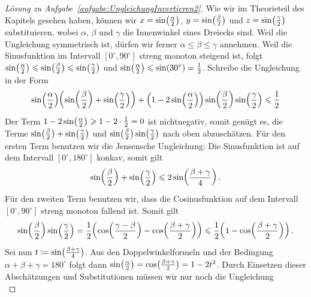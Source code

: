 \begin{proof}[Lösung zu Aufgabe~\ref{aufgabe:UngleichungInvertieren2}]
	Wie wir im Theorieteil des Kapitels gesehen haben, können wir $x=\sin\parens[\big]{\frac{\alpha}2}$, $y=\sin\parens[\big]{\frac{\beta}2}$ und $z=\sin\parens[\big]{\frac{\gamma}2}$ substituieren, wobei $\alpha$, $\beta$ und $\gamma$ die Innenwinkel eines Dreiecks sind. Weil die Ungleichung symmetrisch ist, dürfen wir ferner $\alpha\leqslant \beta\leqslant \gamma$ annehmen. Weil die Sinusfunktion im Intervall $[0^\circ,90^\circ]$ streng monoton steigend ist, folgt $\sin\parens[\big]{\frac{\alpha}2}\leqslant\sin\parens[\big]{\frac{\beta}2}\leqslant\sin\parens[\big]{\frac{\gamma}2}$ und $\sin\parens[\big]{\frac{\alpha}2}\leqslant \sin(30^\circ)=\frac12$. Schreibe die Ungleichung in der Form
	\begin{equation*}
		\sin\parens*{\frac{\alpha}2}\parens*{\sin\parens*{\frac{\beta}2}+\sin\parens*{\frac{\gamma}2}}+\parens*{1-2\sin\parens*{\frac{\alpha}2}}\sin\parens*{\frac{\beta}2}\sin\parens*{\frac{\gamma}2}\leqslant \frac12
	\end{equation*}
	Der Term $1-2\sin\parens[\big]{\frac{\alpha}2}\geqslant 1-2\cdot\frac12=0$ ist nichtnegativ, somit genügt es, die Terme $\sin\parens[\big]{\frac{\beta}2}+\sin\parens[\big]{\frac{\gamma}2}$ und $\sin\parens[\big]{\frac{\beta}2}\sin\parens[\big]{\frac{\gamma}2}$ nach oben abzuschätzen. Für den ersten Term benutzen wir die Jensensche Ungleichung: Die Sinusfunktion ist auf dem Intervall $[0^\circ,180^\circ]$ konkav, somit gilt
	\begin{equation*}
		\sin\parens*{\frac{\beta}2}+\sin\parens*{\frac{\gamma}2}\leqslant 2\sin\parens*{\frac{\beta+\gamma}{4}}\,.
	\end{equation*}
	Für den zweiten Term benutzen wir, dass die Cosinusfunktion auf dem Intervall $[0^\circ,90^\circ]$ streng monoton fallend ist. Somit gilt
	\begin{equation*}
		\sin\parens*{\frac{\beta}2}\sin\parens*{\frac{\gamma}2}=\frac12\parens*{\cos\parens*{\frac{\gamma-\beta}{2}}-\cos\parens*{\frac{\beta+\gamma}{2}}}\leqslant \frac12\parens*{1-\cos\parens*{\frac{\beta+\gamma}{2}}}\,.
	\end{equation*}
	Sei nun $t\coloneqq \sin\parens[\big]{\frac{\beta+\gamma}{4}}$. Aus den Doppelwinkelformeln und der Bedingung $\alpha+\beta+\gamma=180^\circ$ folgt dann $\sin\parens[\big]{\frac\alpha2}=\cos\parens[\big]{\frac{\beta+\gamma}{2}}=1-2t^2$. Durch Einsetzen dieser Abschätzungen und Substitutionen müssen wir nur noch die Ungleichung
	\begin{equation*}

\end{equation*}
\end{proof}
